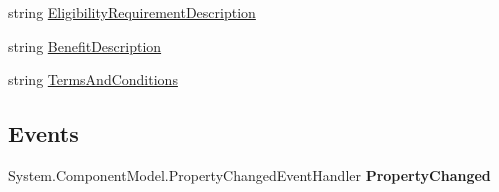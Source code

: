 \begin{DoxyCompactItemize}
\begin{DoxyCompactList}\small\item\em \end{DoxyCompactList}\item 
\hypertarget{class_amazon___price___finder_1_1amazon_1_1ecs_1_1_promotion_summary_a671006dfbabd186a1b751a9558846e82}{string \hyperlink{class_amazon___price___finder_1_1amazon_1_1ecs_1_1_promotion_summary_a671006dfbabd186a1b751a9558846e82}{Eligibility\-Requirement\-Description}}\label{class_amazon___price___finder_1_1amazon_1_1ecs_1_1_promotion_summary_a671006dfbabd186a1b751a9558846e82}

\begin{DoxyCompactList}\small\item\em \end{DoxyCompactList}\item 
\hypertarget{class_amazon___price___finder_1_1amazon_1_1ecs_1_1_promotion_summary_abbbc376669e5426f0eb7bf7e81107972}{string \hyperlink{class_amazon___price___finder_1_1amazon_1_1ecs_1_1_promotion_summary_abbbc376669e5426f0eb7bf7e81107972}{Benefit\-Description}}\label{class_amazon___price___finder_1_1amazon_1_1ecs_1_1_promotion_summary_abbbc376669e5426f0eb7bf7e81107972}

\begin{DoxyCompactList}\small\item\em \end{DoxyCompactList}\item 
\hypertarget{class_amazon___price___finder_1_1amazon_1_1ecs_1_1_promotion_summary_aae7bfc919efff7acf6bc8bcface52fc7}{string \hyperlink{class_amazon___price___finder_1_1amazon_1_1ecs_1_1_promotion_summary_aae7bfc919efff7acf6bc8bcface52fc7}{Terms\-And\-Conditions}}\label{class_amazon___price___finder_1_1amazon_1_1ecs_1_1_promotion_summary_aae7bfc919efff7acf6bc8bcface52fc7}

\begin{DoxyCompactList}\small\item\em \end{DoxyCompactList}\end{DoxyCompactItemize}
\subsection*{Events}
\begin{DoxyCompactItemize}
\item 
\hypertarget{class_amazon___price___finder_1_1amazon_1_1ecs_1_1_promotion_summary_a57deccfad8f428f915a2772b394d10ae}{System.\-Component\-Model.\-Property\-Changed\-Event\-Handler {\bfseries Property\-Changed}}\label{class_amazon___price___finder_1_1amazon_1_1ecs_1_1_promotion_summary_a57deccfad8f428f915a2772b394d10ae}

\end{DoxyCompactItemize}


